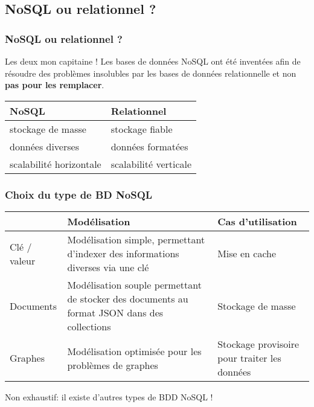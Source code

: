 	\subsection{NoSQL ou relationnel ?}
		\begin{frame}
			\frametitle{NoSQL ou relationnel ?}

			\begin{alertblock}{Les deux mon capitaine !}
				Les bases de données NoSQL ont été inventées afin de résoudre des problèmes insolubles par les bases de données relationnelle et non \textbf{pas pour les remplacer}.
			\end{alertblock}

			\vspace{20px}

			\begin{tabular}{|l|l|}
				\hline
				\textbf{NoSQL} & \textbf{Relationnel} \\ \hline\hline
				stockage de masse & stockage fiable \\ \hline
				données diverses & données formatées \\ \hline
				scalabilité horizontale & scalabilité verticale \\ \hline
			\end{tabular}
		\end{frame}

		\begin{frame}
			\frametitle{Choix du type de BD NoSQL}

			\begin{tabular}{|p{}|p{}|p{0.30\textwidth}|}
				\hline
				& Modélisation & Cas d'utilisation \\\hline
				Clé / valeur
				& Modélisation simple, permettant d'indexer des informations diverses via une clé
				& Mise en cache  \\\hline
				Documents
				& Modélisation souple permettant de stocker des documents au format JSON dans des collections
				& Stockage de masse \\\hline
				Graphes
				& Modélisation optimisée pour les problèmes de graphes
				& Stockage provisoire pour traiter les données \\\hline
			\end{tabular}

			\vspace{10px}

			Non exhaustif: il existe d'autres types de BDD NoSQL !
		\end{frame}
